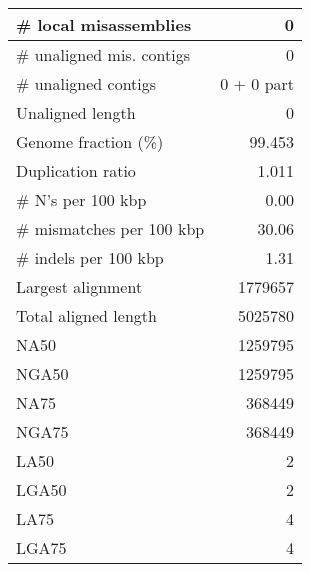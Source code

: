 \documentclass[12pt,a4paper]{article}
\begin{document}
\begin{table}[ht]
\begin{center}
\begin{tabular}{|l*{1}{|r}|}
\# local misassemblies & 0 \\ \hline
\# unaligned mis. contigs & 0 \\ \hline
\# unaligned contigs & 0 + 0 part \\ \hline
Unaligned length & 0 \\ \hline
Genome fraction (\%) & 99.453 \\ \hline
Duplication ratio & 1.011 \\ \hline
\# N's per 100 kbp & 0.00 \\ \hline
\# mismatches per 100 kbp & 30.06 \\ \hline
\# indels per 100 kbp & 1.31 \\ \hline
Largest alignment & 1779657 \\ \hline
Total aligned length & 5025780 \\ \hline
NA50 & 1259795 \\ \hline
NGA50 & 1259795 \\ \hline
NA75 & 368449 \\ \hline
NGA75 & 368449 \\ \hline
LA50 & 2 \\ \hline
LGA50 & 2 \\ \hline
LA75 & 4 \\ \hline
LGA75 & 4 \\ \hline
\end{tabular}
\end{center}
\end{table}
\end{document}
